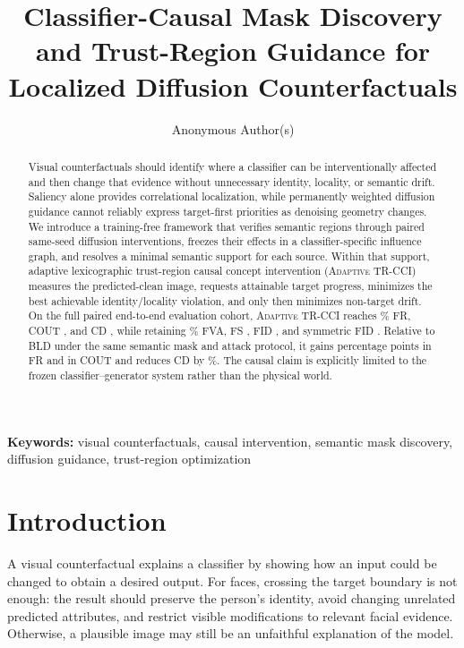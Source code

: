 \documentclass[10pt,twocolumn]{article}
\title{\textbf{Classifier-Causal Mask Discovery and Trust-Region Guidance
for Localized Diffusion Counterfactuals}}
\author{Anonymous Author(s)}
\date{}
\newcommand{\method}{\textsc{Adaptive TR-CCI}}
\newcommand{\bld}{\textsc{BLD}}
\begin{document}
\maketitle

\begin{abstract}
Visual counterfactuals should identify where a classifier can be
interventionally affected and then change that evidence without unnecessary
identity, locality, or semantic drift. Saliency alone provides correlational
localization, while permanently weighted diffusion guidance cannot reliably
express target-first priorities as denoising geometry changes. We introduce a
training-free framework that verifies semantic regions through paired
same-seed diffusion interventions, freezes their effects in a
classifier-specific influence graph, and resolves a minimal semantic support
for each source. Within that support, adaptive lexicographic trust-region
causal concept intervention (\method) measures the predicted-clean image,
requests attainable target progress, minimizes the best achievable
identity/locality violation, and only then minimizes non-target drift. On the
full paired end-to-end evaluation cohort, \method{} reaches
\EndToEndAdaptiveFRPct\% FR, COUT \EndToEndAdaptiveCOUT, and CD
\EndToEndAdaptiveCD, while retaining \EndToEndAdaptiveFVAPct\% FVA, FS
\EndToEndAdaptiveFS, FID \EndToEndAdaptiveFID, and symmetric FID
\EndToEndAdaptiveSymmetricFID. Relative to \bld{} under the same semantic mask
and attack protocol, it gains \EndToEndFRGainPctPoints{} percentage points in
FR and \EndToEndCOUTGain{} in COUT and reduces CD by
\EndToEndCDReductionPct\%. The causal claim is explicitly limited to the
frozen classifier--generator system rather than the physical world.
\end{abstract}

\noindent\textbf{Keywords:} visual counterfactuals, causal intervention,
semantic mask discovery, diffusion guidance, trust-region optimization

\section{Introduction}

A visual counterfactual explains a classifier by showing how an input could be
changed to obtain a desired output. For faces, crossing the target boundary is
not enough: the result should preserve the person's identity, avoid changing
unrelated predicted attributes, and restrict visible modifications to relevant
facial evidence. Otherwise, a plausible image may still be an unfaithful
explanation of the model.
\end{document}
